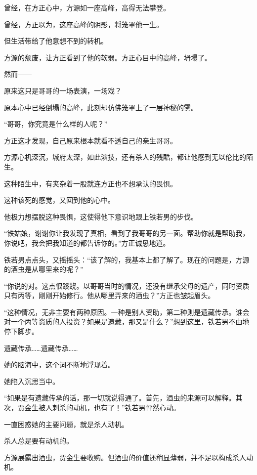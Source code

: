 
\begin{this_body}

曾经，在方正心中，方源如一座高峰，高得无法攀登。

曾经，方正以为，这座高峰的阴影，将笼罩他一生。

但生活带给了他意想不到的转机。

方源的颓废，让方正看到了他的软弱。方正心目中的高峰，坍塌了。

然而——

原来这只是哥哥的一场表演，一场戏？

原本心中已经倒塌的高峰，此刻却仿佛笼罩上了一层神秘的雾。

“哥哥，你究竟是什么样的人呢？”

方正这才发现，自己原来根本就看不透自己的亲生哥哥。

方源心机深沉，城府太深，如此演技，还有杀人的残酷，都让他感到无以伦比的陌生。

这种陌生中，有夹杂着一股就连方正也不想承认的畏惧。

这种该死的感觉，又回到他的心中。

他极力想摆脱这种畏惧，这使得他下意识地跟上铁若男的步伐。

“铁姑娘，谢谢你让我发现了真相，看到了我哥哥的另一面。帮助你就是帮助我，你说吧，我会把我知道的都告诉你的。”方正诚恳地道。

铁若男点点头，又摇摇头：“该了解的，我基本上都了解了。现在的问题是，方源的酒虫是从哪里来的呢？”

“你说的对。这点很蹊跷。以哥哥当时的情况，还没有继承父母的遗产，同时资质只有丙等，刚刚开始修行。他从哪里弄来的酒虫？”方正也皱起眉头。

“这种情况，无非主要有两种原因。一种是别人资助，第二种则是遗藏传承。谁会对一个丙等资质的人投资？如果是遗藏，那又是什么？”想到这里，铁若男不由地停下脚步。

遗藏传承……遗藏传承……

她的脑海中，这个词不断地浮现着。

她陷入沉思当中。

“如果是有遗藏传承的话，那一切就说得通了。首先，酒虫的来源可以解释。其次，贾金生被人刺杀的动机，也有了！”铁若男怦然心动。

一直困惑她的主要问题，就是杀人动机。

杀人总是要有动机的。

方源展露出酒虫，贾金生要收购。但酒虫的价值还稍显薄弱，并不足以构成杀人动机。


\end{this_body}
